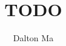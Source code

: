 \documentclass[final]{article}
\title{TODO}
\author{Dalton Ma}
\numberwithin{figure}{section}
\numberwithin{table}{section}
\numberwithin{listing}{section}
\begin{document}
\begin{titlepage}
\thispagestyle{empty}
\maketitle
\tableofcontents
\listoffigures
\listoflistings
\end{titlepage}
\end{document}
